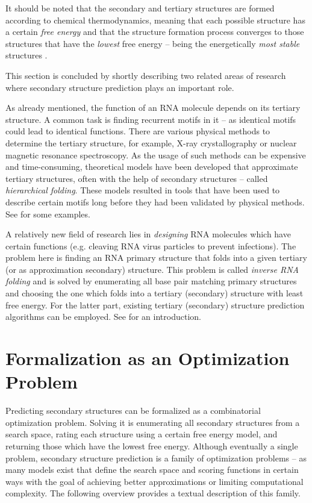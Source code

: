 \documentclass[
    a4paper,
    12pt,
    twoside,
    BCOR=12mm,
    parskip=half,
    chapterprefix,
    numbers=noenddot,
    bibliography=totoc
]{scrbook}
\begin{document}
It should be noted that the secondary and tertiary structures are formed according to chemical thermodynamics, meaning that each possible structure has a certain \emph{free energy} and that the structure formation process converges to those structures that have the \emph{lowest} free energy -- being the energetically \emph{most stable} structures \citep{ignacio_how_1999}.

This section is concluded by shortly describing two related areas of research where secondary structure prediction plays an important role.

As already mentioned, the function of an \gls{RNA} molecule depends on its tertiary structure. A common task is finding recurrent motifs in it -- as identical motifs could lead to identical functions. There are various physical methods to determine the tertiary structure, for example, X-ray crystallography or nuclear magnetic resonance spectroscopy. As the usage of such methods can be expensive and time-consuming, theoretical models have been developed that approximate tertiary structures, often with the help of secondary structures -- called \emph{hierarchical folding}. These models resulted in tools that have been used to describe certain motifs long before they had been validated by physical methods. See \citet[sect. 5.3]{meyers_rna_2000} for some examples.

A relatively new field of research lies in \emph{designing} \gls{RNA} molecules which have certain functions (e.g. cleaving \gls{RNA} virus particles to prevent infections). The problem here is finding an RNA primary structure that folds into a given tertiary (or as approximation secondary) structure. This problem is called \emph{inverse RNA folding} and is solved by enumerating all base pair matching primary structures and choosing the one which folds into a tertiary (secondary) structure with least free energy. For the latter part, existing tertiary (secondary) structure prediction algorithms can be employed. See \citet{andronescu_new_2004} for an introduction.

\section{Formalization as an Optimization Problem}
\label{sec:rna_optimization_problem}

Predicting secondary structures can be formalized as a combinatorial optimization problem. Solving it is enumerating all secondary structures from a search space, rating each structure using a certain free energy model, and returning those which have the lowest free energy.
Although eventually a single problem, secondary structure prediction is a family of optimization problems -- as many models exist that define the search space and scoring functions in certain ways with the goal of achieving better approximations or limiting computational complexity. The following overview provides a textual description of this family.
\end{document}
